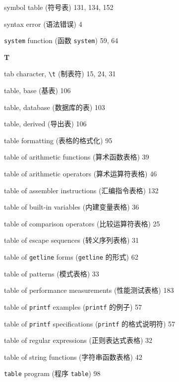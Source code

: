\begin{multicols}{2}
\hangindent=2pc  symbol table (符号表) 131, 134, 152

\hangindent=2pc  syntax error (语法错误) 4

\hangindent=2pc  \verb'system' function (函数 \verb'system') 59, 64

\medskip\textbf{\large{T}}

\hangindent=2pc  tab character, \verb'\t' (制表符) 15, 24, 31

\hangindent=2pc  table, base (基表) 106

\hangindent=2pc  table, database (数据库的表) 103

\hangindent=2pc  table, derived (导出表) 106

\hangindent=2pc  table formatting (表格的格式化) 95

\hangindent=2pc  table of arithmetic functions (算术函数表格) 39

\hangindent=2pc  table of arithmetic operators (算术运算符表格) 46

\hangindent=2pc  table of assembler instructions (汇编指令表格) 132

\hangindent=2pc  table of built-in variables (内建变量表格) 36

\hangindent=2pc  table of comparison operators (比较运算符表格) 25

\hangindent=2pc  table of escape sequences (转义序列表格) 31

\hangindent=2pc  table of \verb'getline' forms (\verb'getline'
的形式) 62

\hangindent=2pc  table of patterns (模式表格) 33

\hangindent=2pc  table of performance measurements (性能测试表格)
183

\hangindent=2pc  table of \verb'printf' examples (\verb'printf'
的例子) 57

\hangindent=2pc  table of \verb'printf' specifications
(\verb'printf' 的格式说明符) 57

\hangindent=2pc  table of regular expressions (正则表达式表格) 32

\hangindent=2pc  table of string functions (字符串函数表格) 42

\hangindent=2pc  \verb'table' program (程序 \verb'table') 98


\end{multicols}
